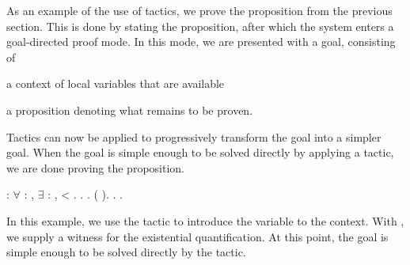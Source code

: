 As an example of the use of tactics, we prove the proposition from the
previous section. This is done by stating the proposition, after which
the system enters a goal-directed proof mode. In this mode, we are
presented with a goal, consisting of
\begin{inparaenum}[(i)]
\item a context of local variables that are available
\item a proposition denoting what remains to be proven.
\end{inparaenum}
Tactics can now be applied to progressively transform the goal into a
simpler goal. When the goal is simple enough to be solved directly by
applying a tactic, we are done proving the proposition.
\begin{singlespace}
\begin{coqdoccode}
\coqdocnoindent
{}
 :
\ensuremath{\forall}  :
,
\ensuremath{\exists}  :
,
 < .\coqdoceol
\coqdocnoindent
{}.\coqdoceol
\coqdocindent{1.0em}
 .\coqdoceol
\coqdocindent{1.0em}
(
).\coqdoceol
\coqdocindent{1.0em}
.\coqdoceol
\coqdocnoindent
{}.\coqdoceol
\end{coqdoccode}
\end{singlespace}
In this example, we use the tactic  to introduce the
variable  to the context. With ,
we supply a witness for the existential quantification. At this point,
the goal is simple enough to be solved directly by the
 tactic.

